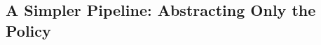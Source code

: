 \documentclass[twoside]{article}
\newtheorem{theorem}{Theorem}
\newtheorem{condition}{Condition}
\newcommand{\CAL}[1]{\mathcal{#1}}
\begin{document}
\subsection{A Simpler Pipeline: Abstracting Only the Policy}

\end{document}

